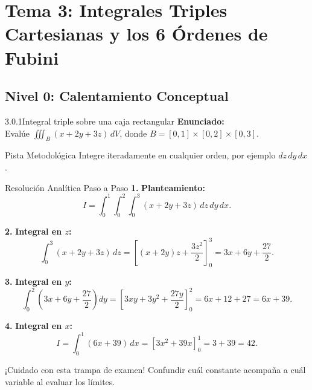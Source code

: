 \documentclass[11pt,a4paper]{article}
\begin{document}
\section{Tema 3: Integrales Triples Cartesianas y los 6 Órdenes de Fubini}

\subsection{Nivel 0: Calentamiento Conceptual}

\begin{nivelbox}{3.0.1}{Integral triple sobre una caja rectangular}
\textbf{Enunciado:}\\
Evalúe $\iiint_B (x + 2y + 3z) \, dV$, donde $B = [0, 1] \times [0, 2] \times [0, 3]$.

\begin{observacionbox}{Pista Metodológica}
Integre iteradamente en cualquier orden, por ejemplo $dz \, dy \, dx$.
\end{observacionbox}

\begin{ejerciciobox}{Resolución Analítica Paso a Paso}
\smallskip\noindent\textbf{1.} \textbf{Planteamiento:}
\[I = \int_0^1 \int_0^2 \int_0^3 (x + 2y + 3z) \, dz \, dy \, dx.\]

\smallskip\noindent\textbf{2.} \textbf{Integral en $z$:}
\[\int_0^3 (x + 2y + 3z) \, dz = \left[ (x + 2y)z + \frac{3z^2}{2} \right]_0^3 = 3x + 6y + \frac{27}{2}.\]

\smallskip\noindent\textbf{3.} \textbf{Integral en $y$:}
\[\int_0^2 \left( 3x + 6y + \frac{27}{2} \right) dy = \left[ 3xy + 3y^2 + \frac{27y}{2} \right]_0^2 = 6x + 12 + 27 = 6x + 39.\]

\smallskip\noindent\textbf{4.} \textbf{Integral en $x$:}
\[I = \int_0^1 (6x + 39) \, dx = \left[ 3x^2 + 39x \right]_0^1 = 3 + 39 = 42.\]
\end{ejerciciobox}

\begin{errorbox}{¡Cuidado con esta trampa de examen!}
Confundir cuál constante acompaña a cuál variable al evaluar los límites.
\end{errorbox}
\end{nivelbox}
\bigskip
\end{document}
